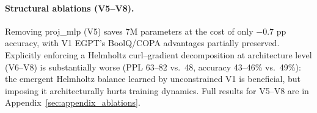 \paragraph{Structural ablations (V5--V8).}
Removing proj\_mlp (V5) saves 7M parameters at the cost of only $-0.7$ pp accuracy,
with V1 EGPT's BoolQ/COPA advantages partially preserved.
Explicitly enforcing a Helmholtz curl--gradient decomposition at architecture level (V6--V8)
is substantially worse (PPL 63--82 vs.\ 48, accuracy 43--46\% vs.\ 49\%):
the emergent Helmholtz balance learned by unconstrained V1 is beneficial, but imposing it
architecturally hurts training dynamics.
Full results for V5--V8 are in Appendix~\ref{sec:appendix_ablations}.

